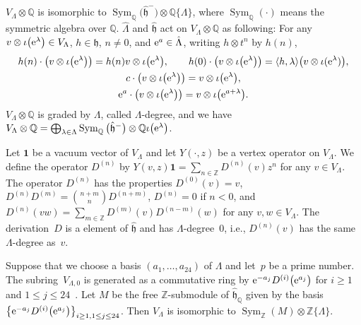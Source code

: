 \documentclass[10pt,a4paper]{amsart}
\numberwithin{equation}{section}
\begin{document}
$V_\Lambda\otimes \mathbb{Q}$ is isomorphic to $\operatorname{Sym}_{\mathbb{Q}}\big(\hat{\mathfrak{h}}^-\big)\otimes \mathbb{Q}\{\Lambda \}$, where $\operatorname{Sym}_{\mathbb{Q}}(\cdot)$ means the symmetric algebra over $\mathbb{Q}$.
$\hat{\Lambda}$ and $\hat{\mathfrak{h}}$ act on $V_\Lambda\otimes \mathbb{Q}$ as following: For any $v \otimes \iota\big({\rm e}^\lambda\big) \in V_\Lambda$, $h\in \mathfrak{h}$, $n\neq 0$, and ${\rm e}^a \in \hat{\Lambda}$, writing $h\otimes t^n$ by $h(n)$,
\begin{gather*}
h(n)\cdot \big(v \otimes \iota\big({\rm e}^\lambda\big)\big)=h(n)v \otimes \iota\big({\rm e}^\lambda\big),\qquad h(0)\cdot \big(v \otimes \iota\big({\rm e}^\lambda\big)\big)=\langle h,\lambda \rangle \big(v \otimes \iota({\rm e}^\lambda)\big), \\
c\cdot\big(v \otimes \iota\big({\rm e}^\lambda\big)\big)=v \otimes \iota\big({\rm e}^\lambda\big),\\
 {\rm e}^a\cdot \big(v \otimes \iota\big({\rm e}^\lambda\big)\big)=v \otimes \iota\big({\rm e}^{a+\lambda}\big).
\end{gather*}
 $V_\Lambda\otimes \mathbb{Q}$ is graded by $\Lambda$, called $\Lambda$-degree, and we have $V_\Lambda\otimes \mathbb{Q}=\bigoplus_{\lambda \in \Lambda} \operatorname{Sym}_{\mathbb{Q}}\big(\hat{\mathfrak{h}}^-\big)\otimes \mathbb{Q}\iota \big({\rm e}^\lambda\big)$.

Let $\mathbf{1}$ be a vacuum vector of $V_{\Lambda}$ and let $Y(\cdot,z)$ be a vertex operator on $V_{\Lambda}$.
We define the operator $D^{(n)}$ by $Y(v,z)\mathbf{1}=\sum_{n\in \mathbb{Z}}D^{(n)}(v)z^n$ for any $v\in V_{\Lambda}$. The operator $D^{(n)}$ has the properties $D^{(0)}(v)=v$, $D^{(n)}D^{(m)}={n+m \choose n}D^{(n+m)}$, $D^{(n)}=0$ if $n<0$, and $D^{(n)}(vw)=\sum_{m\in \mathbb{Z}}D^{(m)}(v)D^{(n-m)}(w)$ for any $v,w \in V_\Lambda$. The derivation~$D$ is a element of $\hat{\mathfrak{h}}$ and has $\Lambda$-degree~0, i.e., $D^{(n)}(v)$ has the same $\Lambda$-degree as~$v$.

Suppose that we choose a basis $(a_1,\dots,a_{24})$ of $\Lambda$ and let~$p$ be a prime number. The sub\-ring~$V_{\Lambda,0}$ is generated as a commutative ring by ${\rm e}^{-a_j}D^{(i)}\big({\rm e}^{a_j}\big)$ for $i\geq 1$ and $1\leq j \leq 24$~\cite{BR}. Let $M$ be the free $\mathbb{Z}$-submodule of $\hat{\mathfrak{h}}_\mathbb{Q}$ given by the basis $\big\{{\rm e}^{-a_j}D^{(i)}\big({\rm e}^{a_j}\big)\big\}_{i\geq 1,1\leq j \leq 24}$. Then $V_{\Lambda}$ is isomorphic to $\operatorname{Sym}_{\mathbb{Z}}(M)\otimes \mathbb{Z}\{\Lambda\}$.
\end{document}
